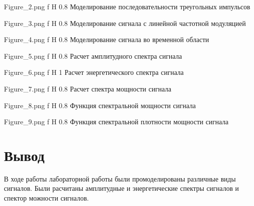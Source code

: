 \documentclass{bmstu}
\begin{document}
    {Figure_2.png} %
    {f} %
    {H} %
    {0.8\textwidth} %
    {Моделирование последовательности треугольных импульсов} %

    {Figure_3.png} %
    {f} %
    {H} %
    {0.8\textwidth} %
    {Моделирование сигнала с линейной частотной модуляцией} %

    {Figure_4.png} %
    {f} %
    {H} %
    {0.8\textwidth} %
    {Моделирование сигнала во временной области} %

    {Figure_5.png} %
    {f} %
    {H} %
    {0.8\textwidth} %
    {Расчет амплитудного спектра сигнала} %

    {Figure_6.png} %
    {f} %
    {H} %
    {1\textwidth} %
    {Расчет энергетического спектра сигнала} %

    {Figure_7.png} %
    {f} %
    {H} %
    {0.8\textwidth} %
    {Расчет спектра мощности сигнала} %

    {Figure_8.png} %
    {f} %
    {H} %
    {0.8\textwidth} %
    {Функция спектральной мощности сигнала} %

    {Figure_9.png} %
    {f} %
    {H} %
    {0.8\textwidth} %
    {Функция спектральной плотности мощности сигнала} %

\section*{Вывод}
В ходе работы лабораторной работы были промоделированы различные виды сигналов. Были расчитаны амплитудные и энергетические спектры сигналов и спектор можности сигналов.
\end{document}

